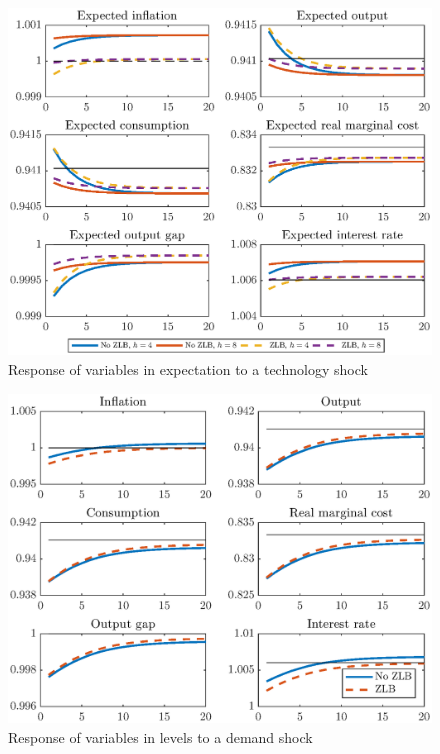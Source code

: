 \documentclass[12pt]{article}
\numberwithin{equation}{section}
\begin{document}
\begin{figure}[H]
	\centering
	\caption{Response of variables in expectation to a technology shock}\label{fig:m2_irfExp_tfp}
	\includegraphics[scale=0.7]{m2_irfExp_tfp}
\end{figure}

\begin{figure}[H]
	\centering
	\caption{Response of variables in levels to a demand shock}\label{fig:m2_irfLevel_pref}
	\includegraphics[scale=0.7]{m2_irfLevel_pref}
\end{figure}
\end{document}
